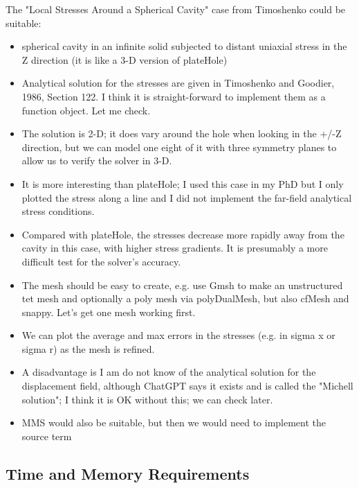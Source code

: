 \documentclass[sn-mathphys,Numbered]{sn-jnl}%
\begin{document}
The "Local Stresses Around a Spherical Cavity" case from Timoshenko could be suitable:
\begin{itemize}
	\item spherical cavity in an infinite solid subjected to distant uniaxial stress in the Z direction (it is like a 3-D version of plateHole) 
	\item Analytical solution for the stresses are given in Timoshenko and Goodier, 1986, Section 122. I think it is straight-forward to implement them as a function object. Let me check.
	\item The solution is 2-D; it does vary around the hole when looking in the +/-Z direction, but we can model one eight of it with three symmetry planes to allow us to verify the solver in 3-D.
	\item It is more interesting than plateHole; I used this case in my PhD but I only plotted the stress along a line and I did not implement the far-field analytical stress conditions.
	\item Compared with plateHole, the stresses decrease more rapidly away from the cavity in this case, with higher stress gradients. It is presumably a more difficult test for the solver's accuracy.
	\item The mesh should be easy to create, e.g. use Gmsh to make an unstructured tet mesh and optionally a poly mesh via polyDualMesh, but also cfMesh and snappy. Let's get one mesh working first.
	\item We can plot the average and max errors in the stresses (e.g. in sigma x or sigma r) as the mesh is refined.
	\item A disadvantage is I am do not know of the analytical solution for the displacement field, although ChatGPT says it exists and is called the "Michell solution"; I think it is OK without this; we can check later.
	\item MMS would also be suitable, but then we would need to implement the source term
\end{itemize}


\subsection{Time and Memory Requirements}
\end{document}
